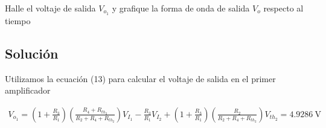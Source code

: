 \documentclass{article}
\begin{document}
Halle el voltaje de salida $V_{o_1}$ y grafique la forma de onda de salida $V_o$ respecto al tiempo

\subsection{Solución}

Utilizamos la ecuación (13) para calcular el voltaje de salida en el primer amplificador

\begin{align}
V_{o_1} = \left( 1 + \frac{R_3}{R_1} \right) \left( \frac{R_4 + R_{th_2}}{R_2 + R_4 + R_{th_2}} \right)V_{I_1} -\frac{R_3}{R_1}V_{I_2} + \left( 1 + \frac{R_3}{R_1} \right) \left( \frac{R_2}{R_2 + R_4 + R_{th_2}} \right)V_{th_2} = \qty{4.9286}{\volt}	
\end{align}

\begin{figure}[H]
	\centering
\end{figure}
\end{document}
